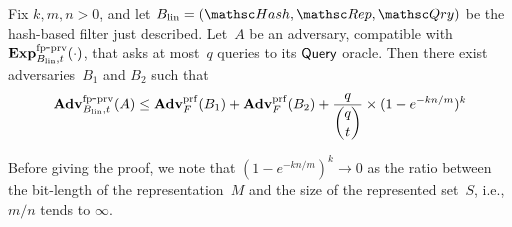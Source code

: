 \begin{theorem}\label{thm1}
Fix $k,m,n>0$, and let $B_\mathrm{lin}=(\Hash,\Rep,\Qry)$ be the hash-based filter just described. 
Let~$A$ be an adversary, compatible with $\mathrm{\mathbf{Exp}}^{\mathrm{fp\mbox{-}prv}}_{B_\mathrm{lin},t}(\cdot)$, that asks at most~$q$ queries to its $\mathsf{Query}$ oracle.  Then there exist adversaries~$B_1$ and $B_2$ such that
\[
\mathrm{\mathbf{Adv}}^{\mathrm{fp\mbox{-}prv}}_{B_{\mathrm{lin}},t}(A) \leq  \mathbf{Adv}^{\mathrm{prf}}_{F}(B_1) + \mathbf{Adv}^{\mathrm{prf}}_{F}(B_2)  + \frac{q}{\dbinom{q}{t}} \times  (1-e^{-kn/m})^k
\]
\end{theorem}
Before giving the proof, we note that  $(1-e^{-kn/m})^k \rightarrow 0$ as the ratio between the bit-length of the representation~$M$ and the size of the represented set~$S$, i.e.,$m/n$ tends to $\infty$.
%
